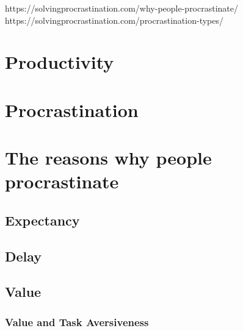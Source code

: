 https://solvingprocrastination.com/why-people-procrastinate/
https://solvingprocrastination.com/procrastination-types/


\section{Productivity}




\section{Procrastination}



\section{The reasons why people procrastinate}


\subsection{Expectancy}


\subsection{Delay}


\subsection{Value}


\subsubsection{Value and Task Aversiveness}



